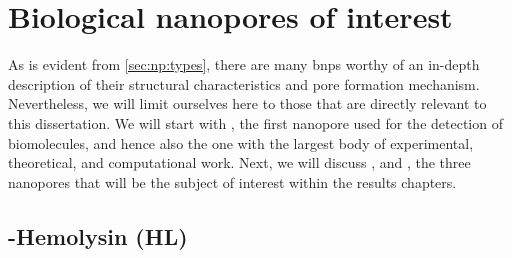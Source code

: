 \clearpage

%
%
\section{Biological nanopores of interest}
%
\label{sec:np:interest}

As is evident from \cref{sec:np:types}, there are many \glspl{bnp} worthy of an in-depth description of their
structural characteristics and pore formation mechanism. Nevertheless, we will limit ourselves here to those
that are directly relevant to this dissertation. We will start with , the first nanopore used
for the detection of biomolecules, and hence also the one with the largest body of experimental, theoretical,
and computational work. Next, we will discuss ,  and , the three
nanopores that will be the subject of interest within the results chapters.


\subsection[Alpha-Hemolysin (aHL)]{\ta-Hemolysin (\ta{}HL)}
%
\label{sec:np:ahl}
%

